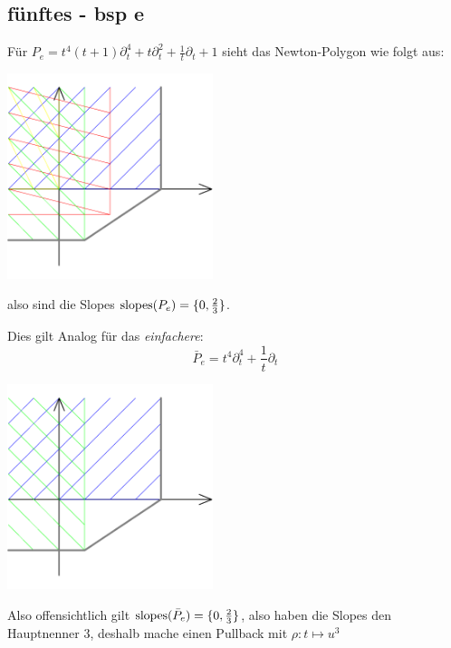 \subsection{fünftes - bsp e}
Für $ P_e=t^4(t+1)\partial_t^4 + t\partial_t^2+\frac{1}{t}\partial_t+1 $ sieht
das Newton-Polygon wie folgt aus:

\begin{center}
  \includegraphics[width=6cm]{beispiele/img/e.png}
\end{center}

also sind die Slopes $\operatorname{slopes}(P_e)=\{0,\frac{2}{3}\}$.

Dies gilt Analog für das \emph{einfachere}:
\[ \bar P_e=t^4\partial_t^4 +\frac{1}{t}\partial_t \]

\begin{center}
  \includegraphics[width=6cm]{beispiele/img/bar_e.png}
\end{center}
Also offensichtlich gilt $\operatorname{slopes}(\bar P_e)=\{0,\frac{2}{3}\}$, also haben die
Slopes den Hauptnenner $3$, deshalb mache einen Pullback mit $\rho:t\mapsto u^3$

